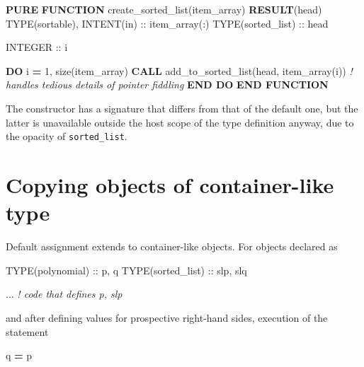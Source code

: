 \documentclass[
]{scrartcl}
\newenvironment{Shaded}{}{}
\newcommand{\CommentTok}[1]{\textcolor[rgb]{0.38,0.63,0.69}{\textit{#1}}}
\newcommand{\DataTypeTok}[1]{\textcolor[rgb]{0.56,0.13,0.00}{#1}}
\newcommand{\DecValTok}[1]{\textcolor[rgb]{0.25,0.63,0.44}{#1}}
\newcommand{\FunctionTok}[1]{\textcolor[rgb]{0.02,0.16,0.49}{#1}}
\newcommand{\KeywordTok}[1]{\textcolor[rgb]{0.00,0.44,0.13}{\textbf{#1}}}
\newcommand{\NormalTok}[1]{#1}
\begin{document}
\begin{Shaded}
\begin{Highlighting}[]
\KeywordTok{PURE} \KeywordTok{FUNCTION}\NormalTok{ create\_sorted\_list(item\_array) }\KeywordTok{RESULT}\NormalTok{(head)}
   \DataTypeTok{TYPE(sortable)}\NormalTok{, }\DataTypeTok{INTENT(in)} \DataTypeTok{::}\NormalTok{ item\_array(:)}
   \DataTypeTok{TYPE(sorted\_list)} \DataTypeTok{::}\NormalTok{ head}

   \DataTypeTok{INTEGER} \DataTypeTok{::}\NormalTok{ i}

   \KeywordTok{DO}\NormalTok{ i }\KeywordTok{=} \DecValTok{1}\NormalTok{, }\FunctionTok{size}\NormalTok{(item\_array)}
      \KeywordTok{CALL}\NormalTok{ add\_to\_sorted\_list(head, item\_array(i))}
      \CommentTok{! handles tedious details of pointer fiddling}
   \KeywordTok{END DO}
\KeywordTok{END FUNCTION}
\end{Highlighting}
\end{Shaded}

The constructor has a signature that differs from that of the default
one, but the latter is unavailable outside the host scope of the type
definition anyway, due to the opacity of \texttt{sorted\_list}.

\section{Copying objects of container-like
type}\label{copying-objects-of-container-like-type}

Default assignment extends to container-like objects. For objects
declared as

\begin{Shaded}
\begin{Highlighting}[]
\DataTypeTok{TYPE(polynomial)} \DataTypeTok{::}\NormalTok{ p, q}
\DataTypeTok{TYPE(sorted\_list)} \DataTypeTok{::}\NormalTok{ slp, slq}

\NormalTok{... }\CommentTok{! code that defines p, slp}
\end{Highlighting}
\end{Shaded}

and after defining values for prospective right-hand sides, execution of
the statement

\begin{Shaded}
\begin{Highlighting}[]
\NormalTok{q }\KeywordTok{=}\NormalTok{ p}
\end{Highlighting}
\end{Shaded}
\end{document}

